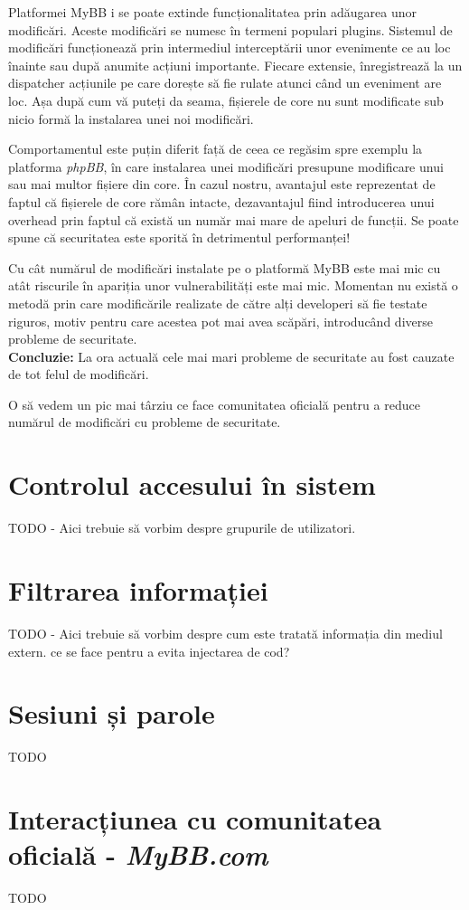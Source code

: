 Platformei MyBB i se poate extinde funcționalitatea prin adăugarea unor modificări. Aceste modificări se numesc în termeni populari plugins. Sistemul de modificări funcționează prin intermediul interceptării unor evenimente ce au loc înainte sau după anumite acțiuni importante. Fiecare extensie, înregistrează la un dispatcher acțiunile pe care dorește să fie rulate atunci când un eveniment are loc. Așa după cum vă puteți da seama, fișierele de core nu sunt modificate sub nicio formă la instalarea unei noi modificări.

Comportamentul este puțin diferit față de ceea ce regăsim spre exemplu la platforma \textit{phpBB}, în care instalarea unei modificări presupune modificare unui sau mai multor fișiere din core. În cazul nostru, avantajul este reprezentat de faptul că fișierele de core rămân intacte, dezavantajul fiind introducerea unui overhead prin faptul că există un număr mai mare de apeluri de funcții. Se poate spune că securitatea este sporită în detrimentul performanței!

\begin{theo}
Cu cât numărul de modificări instalate pe o platformă MyBB este mai mic cu atât riscurile în apariția unor vulnerabilități este mai mic. Momentan nu există o metodă prin care modificările realizate de către alți developeri să fie testate riguros, motiv pentru care acestea pot mai avea scăpări, introducând diverse probleme de securitate.\\
\textbf{Concluzie:} La ora actuală cele mai mari probleme de securitate au fost cauzate de tot felul de modificări.
\end{theo}

O să vedem un pic mai târziu ce face comunitatea oficială pentru a reduce numărul de modificări cu probleme de securitate.

\section{Controlul accesului în sistem}

TODO - Aici trebuie să vorbim despre grupurile de utilizatori.

\section{Filtrarea informației}

TODO - Aici trebuie să vorbim despre cum este tratată informația din mediul extern. ce se face pentru a evita injectarea de cod?

\section{Sesiuni și parole}

TODO

\section{Interacțiunea cu comunitatea oficială - \textit{MyBB.com}}

TODO